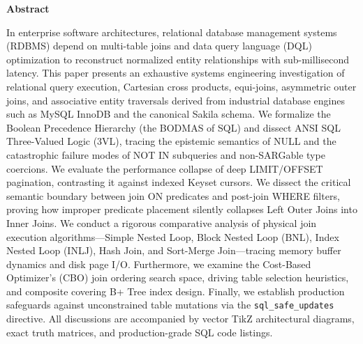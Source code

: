 \documentclass[10pt,twocolumn,letterpaper]{article}
\begin{document}

\thispagestyle{firstpage}

\begin{center}
  {\bfseries\large Abstract}
\end{center}
\vspace{-0.5em}
{\small In enterprise software architectures, relational database management systems (RDBMS) depend on multi-table joins and data query language (DQL) optimization to reconstruct normalized entity relationships with sub-millisecond latency. This paper presents an exhaustive systems engineering investigation of relational query execution, Cartesian cross products, equi-joins, asymmetric outer joins, and associative entity traversals derived from industrial database engines such as MySQL InnoDB and the canonical Sakila schema. We formalize the Boolean Precedence Hierarchy (the BODMAS of SQL) and dissect ANSI SQL Three-Valued Logic (3VL), tracing the epistemic semantics of NULL and the catastrophic failure modes of NOT IN subqueries and non-SARGable type coercions. We evaluate the performance collapse of deep LIMIT/OFFSET pagination, contrasting it against indexed Keyset cursors. We dissect the critical semantic boundary between join ON predicates and post-join WHERE filters, proving how improper predicate placement silently collapses Left Outer Joins into Inner Joins. We conduct a rigorous comparative analysis of physical join execution algorithms---Simple Nested Loop, Block Nested Loop (BNL), Index Nested Loop (INLJ), Hash Join, and Sort-Merge Join---tracing memory buffer dynamics and disk page I/O. Furthermore, we examine the Cost-Based Optimizer's (CBO) join ordering search space, driving table selection heuristics, and composite covering B+ Tree index design. Finally, we establish production safeguards against unconstrained table mutations via the \texttt{sql\_safe\_updates} directive. All discussions are accompanied by vector TikZ architectural diagrams, exact truth matrices, and production-grade SQL code listings.}
\end{document}
